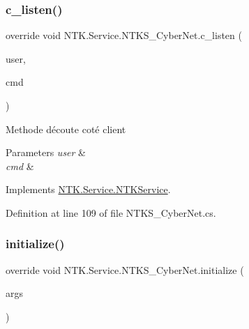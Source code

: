 \mbox{\label{class_n_t_k_1_1_service_1_1_n_t_k_s___cyber_net_ac70faa17037f8ac3fab6f6a4481075ac}} 
\subsubsection{\texorpdfstring{c\_listen()}{c\_listen()}}
{\footnotesize\ttfamily override void N\+T\+K.\+Service.\+N\+T\+K\+S\+\_\+\+Cyber\+Net.\+c\+\_\+listen (\begin{DoxyParamCaption}\item[{\mbox{\hyperlink{class_n_t_k_1_1_n_t_k_user}{N\+T\+K\+User}}}]{user,  }\item[{String}]{cmd }\end{DoxyParamCaption})\hspace{0.3cm}{\ttfamily [virtual]}}



Methode d\textquotesingle{}écoute coté client 


\begin{DoxyParams}{Parameters}
{\em user} & \\
\hline
{\em cmd} & \\
\hline
\end{DoxyParams}


Implements \mbox{\hyperlink{class_n_t_k_1_1_service_1_1_n_t_k_service_a5f591a8d31f2e2b01fc47a17a4102574}{N\+T\+K.\+Service.\+N\+T\+K\+Service}}.



Definition at line 109 of file N\+T\+K\+S\+\_\+\+Cyber\+Net.\+cs.

\mbox{\label{class_n_t_k_1_1_service_1_1_n_t_k_s___cyber_net_aa3cfe3683212d5938bf1e6d0dab4b8c2}} 
\subsubsection{\texorpdfstring{initialize()}{initialize()}}
{\footnotesize\ttfamily override void N\+T\+K.\+Service.\+N\+T\+K\+S\+\_\+\+Cyber\+Net.\+initialize (\begin{DoxyParamCaption}\item[{params object \mbox{[}$\,$\mbox{]}}]{args }\end{DoxyParamCaption})}



